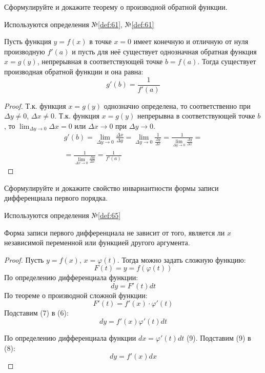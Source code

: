 \begin{question}
    Сформулируйте и докажите теорему о производной обратной функции.
\end{question}
\begin{used}
    Используются определения №\ref{def:61}, №\ref{def:61}
\end{used}
\begin{theorem}
    Пусть функция $y = f(x)$ в точке $x = 0$ имеет конечную и отличную от нуля производную  $f'(a)$ и пусть для неё существует однозначная обратная функция $x = g(y)$, непрерывная в соответствующей точке $b = f(a)$.
    Тогда существует производная обратной функции и она равна:  \[
        g'(b) = \frac{1}{f'(a)}
    \] 
\end{theorem}
\begin{proof}
    Т.к. функция $x = g(y)$ однозначно определена, то соответственно при  $\Delta y \neq 0$, $\Delta x \neq 0$.
    Т.к. функция $x = g(y)$ непрерывна в соответствующей точке $b$, то  $\lim_{\Delta y \to 0} \Delta x = 0$ или $\Delta x \to 0$ при $\Delta y \to 0$.
    \begin{gather*}
        g'(b) = \lim_{\Delta y \to 0} \frac{\Delta x}{\Delta y} = \lim_{\Delta y \to 0} \frac{1}{\frac{\Delta y}{\Delta x}} = \frac{1}{\lim_{\Delta y \to 0} \frac{\Delta y}{\Delta x}} = \\
        = \frac{1}{\lim_{\Delta x \to 0} \frac{\Delta y}{\Delta x}} = \frac{1}{f'(a)}
    \end{gather*}
\end{proof}
\pagebreak



\begin{question}
    Сформулируйте и докажите свойство инвариантности формы записи дифференциала первого порядка.
\end{question}
\begin{used}
    Используются определения №\ref{def:65}
\end{used}
\begin{theorem}
    Форма записи первого дифференциала не зависит от того, является ли $x$ независимой переменной или функцией другого аргумента.
\end{theorem}
\begin{proof}
    Пусть $y = f(x)$,  $x = \varphi(t)$. Тогда можно задать сложную функцию: \[
        F(t) = y = f(\varphi(t))
    \] 
    По определению дифференциала функции: \[
        dy = F'(t)dt \tag{6}
    \] 
    По теореме о производной сложной функции: \[
        F'(t) = f'(x) \cdot \varphi'(t) \tag{7}
    \] 
    Подставим (7) в (6): \[
        dy = f'(x) \varphi'(t) dt \tag{8} 
    \] 

    По определению дифференциала функции $dx = \varphi'(t)dt$ \quad (9).
    Подставим (9) в (8): \[
        \boxed{dy = f'(x) dx}
    \] 
\end{proof}
\pagebreak



